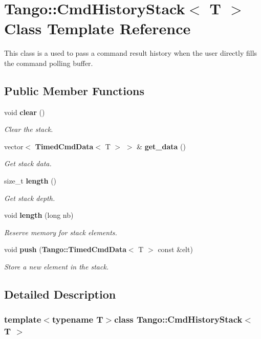 \section{Tango\-:\-:Cmd\-History\-Stack$<$ T $>$ Class Template Reference}
\label{classTango_1_1CmdHistoryStack}


This class is a used to pass a command result history when the user directly fills the command polling buffer.  


\subsection*{Public Member Functions}
\begin{DoxyCompactItemize}
\item 
void {\bf clear} ()
\begin{DoxyCompactList}\small\item\em Clear the stack. \end{DoxyCompactList}\item 
vector$<$ {\bf Timed\-Cmd\-Data}$<$ T $>$ $>$ \& {\bf get\-\_\-data} ()
\begin{DoxyCompactList}\small\item\em Get stack data. \end{DoxyCompactList}\item 
size\-\_\-t {\bf length} ()
\begin{DoxyCompactList}\small\item\em Get stack depth. \end{DoxyCompactList}\item 
void {\bf length} (long nb)
\begin{DoxyCompactList}\small\item\em Reserve memory for stack elements. \end{DoxyCompactList}\item 
void {\bf push} ({\bf Tango\-::\-Timed\-Cmd\-Data}$<$ T $>$ const \&elt)
\begin{DoxyCompactList}\small\item\em Store a new element in the stack. \end{DoxyCompactList}\end{DoxyCompactItemize}


\subsection{Detailed Description}
\subsubsection*{template$<$typename T$>$class Tango\-::\-Cmd\-History\-Stack$<$ T $>$}

